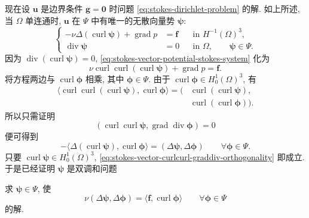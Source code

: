 现在设 $\mathbf{u}$ 是边界条件 $\mathbf{g}=\mathbf{0}$ 时问题
\eqref{eq:stokes-dirichlet-problem} 的解. 如上所述,
当 $\Omega$ 单连通时, $\mathbf{u}$ 在 $\Psi$ 中有唯一的无散向量势
$\boldsymbol{\psi}$:
\begin{equation}\label{eq:stokes-vector-potential-stokes-system}
\left\{
\begin{aligned}
-\nu\Delta(\operatorname{curl}\boldsymbol{\psi})
+\operatorname{grad}p
&=\mathbf{f}
&&\text{in }H^{-1}(\Omega)^3,\\
\operatorname{div}\boldsymbol{\psi}&=0
&&\text{in }\Omega,\qquad
\boldsymbol{\psi}\in\Psi.
\end{aligned}
\right.
\end{equation}
因为
$\operatorname{div}(\operatorname{curl}\boldsymbol{\psi})=0$,
\eqref{eq:stokes-vector-potential-stokes-system} 化为
\[
\nu\operatorname{curl}\operatorname{curl}
(\operatorname{curl}\boldsymbol{\psi})
+\operatorname{grad}p=\mathbf{f}.
\]
将方程两边与
$\operatorname{curl}\boldsymbol{\phi}$ 相乘,
其中 $\boldsymbol{\phi}\in\Psi$. 由于
$\operatorname{curl}\boldsymbol{\phi}\in H_0^1(\Omega)^3$, 有
\[
\begin{aligned}
\langle
\operatorname{curl}\operatorname{curl}
(\operatorname{curl}\boldsymbol{\psi}),
\operatorname{curl}\boldsymbol{\phi}
\rangle
=
(&\operatorname{curl}(\operatorname{curl}\boldsymbol{\psi}),\\
&\operatorname{curl}(\operatorname{curl}\boldsymbol{\phi})).
\end{aligned}
\]
所以只需证明
\begin{equation}\label{eq:stokes-vector-curlcurl-graddiv-orthogonality}
(\operatorname{curl}\operatorname{curl}\boldsymbol{\psi},
\operatorname{grad}\operatorname{div}\boldsymbol{\phi})=0
\end{equation}
便可得到
\[
-\langle
\Delta(\operatorname{curl}\boldsymbol{\psi}),
\operatorname{curl}\boldsymbol{\phi}
\rangle
=
(\Delta\boldsymbol{\psi},
\Delta\boldsymbol{\phi})
\qquad
\forall\boldsymbol{\phi}\in\Psi.
\]
只要
$\operatorname{curl}\boldsymbol{\psi}\in H_0^1(\Omega)^3$,
\eqref{eq:stokes-vector-curlcurl-graddiv-orthogonality} 即成立.
于是已经证明 $\boldsymbol{\psi}$ 是双调和问题

求 $\boldsymbol{\psi}\in\Psi$, 使
\begin{equation}\label{eq:stokes-vector-biharmonic-tangential}
\nu(\Delta\boldsymbol{\psi},
\Delta\boldsymbol{\phi})
=
\langle\mathbf{f},
\operatorname{curl}\boldsymbol{\phi}\rangle
\qquad
\forall\boldsymbol{\phi}\in\Psi
\end{equation}
的解.

